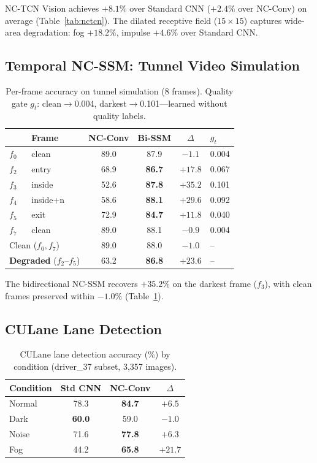 \documentclass[journal]{IEEEtran}
\begin{document}
NC-TCN Vision achieves $+8.1\%$ over Standard CNN ($+2.4\%$ over NC-Conv) on average (Table~\ref{tab:nctcn}).
The dilated receptive field ($15 \times 15$) captures wide-area degradation: fog $+18.2\%$, impulse $+4.6\%$ over Standard CNN.


\subsection{Temporal NC-SSM: Tunnel Video Simulation}
\label{sec:temporal_exp}

\begin{table}[t]
\centering
\caption{Per-frame accuracy on tunnel simulation (8 frames). Quality gate $g_t$: clean$\to$0.004, darkest$\to$0.101---learned without quality labels.}
\label{tab:temporal}
\small
\begin{tabular}{@{}llcccl@{}}
\toprule
& \textbf{Frame} & \textbf{NC-Conv} & \textbf{Bi-SSM} & $\Delta$ & $g_t$ \\
\midrule
$f_0$ & clean    & 89.0 & 87.9 & $-1.1$ & 0.004 \\
$f_2$ & entry    & 68.9 & \textbf{86.7} & $+17.8$ & 0.067 \\
$f_3$ & inside   & 52.6 & \textbf{87.8} & $\mathbf{+35.2}$ & 0.101 \\
$f_4$ & inside+n & 58.6 & \textbf{88.1} & $+29.6$ & 0.092 \\
$f_5$ & exit     & 72.9 & \textbf{84.7} & $+11.8$ & 0.040 \\
$f_7$ & clean    & 89.0 & 88.1 & $-0.9$ & 0.004 \\
\midrule
\multicolumn{2}{l}{Clean ($f_0,f_7$)} & 89.0 & 88.0 & $-1.0$ & -- \\
\multicolumn{2}{l}{\textbf{Degraded} ($f_2$--$f_5$)} & 63.2 & \textbf{86.8} & $\mathbf{+23.6}$ & -- \\
\bottomrule
\end{tabular}
\end{table}

The bidirectional NC-SSM recovers $+35.2\%$ on the darkest frame ($f_3$), with clean frames preserved within $-1.0\%$ (Table~\ref{tab:temporal}).


\subsection{CULane Lane Detection}
\label{sec:culane}

\begin{table}[t]
\centering
\caption{CULane lane detection accuracy (\%) by condition (driver\_37 subset, 3,357 images).}
\label{tab:culane}
\small
\begin{tabular}{@{}lccc@{}}
\toprule
\textbf{Condition} & \textbf{Std CNN} & \textbf{NC-Conv} & $\Delta$ \\
\midrule
Normal & 78.3 & \textbf{84.7} & $+6.5$ \\
Dark   & \textbf{60.0} & 59.0 & $-1.0$ \\
Noise  & 71.6 & \textbf{77.8} & $+6.3$ \\
Fog    & 44.2 & \textbf{65.8} & $\mathbf{+21.7}$ \\
\bottomrule
\end{tabular}
\end{table}
\end{document}

